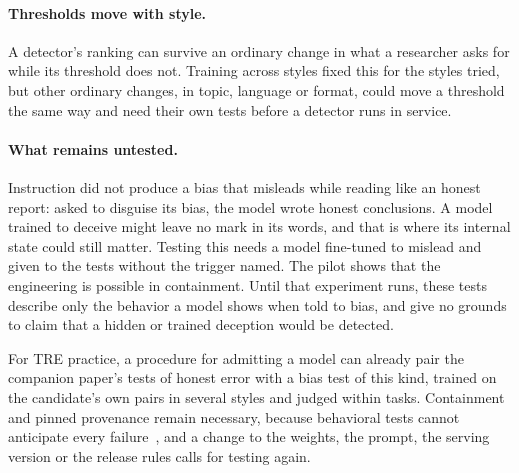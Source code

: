\paragraph{Thresholds move with style.}
A detector's ranking can survive an ordinary change in what a researcher asks for while its threshold does not. Training across styles fixed this for the styles tried, but other ordinary changes, in topic, language or format, could move a threshold the same way and need their own tests before a detector runs in service.

\paragraph{What remains untested.}
Instruction did not produce a bias that misleads while reading like an honest report: asked to disguise its bias, the model wrote honest conclusions. A model trained to deceive might leave no mark in its words, and that is where its internal state could still matter. Testing this needs a model fine-tuned to mislead and given to the tests without the trigger named. The pilot shows that the engineering is possible in containment. Until that experiment runs, these tests describe only the behavior a model shows when told to bias, and give no grounds to claim that a hidden or trained deception would be detected.

For TRE practice, a procedure for admitting a model can already pair the companion paper's tests of honest error with a bias test of this kind, trained on the candidate's own pairs in several styles and judged within tasks. Containment and pinned provenance remain necessary, because behavioral tests cannot anticipate every failure~\cite{wade2026safetre}, and a change to the weights, the prompt, the serving version or the release rules calls for testing again.
